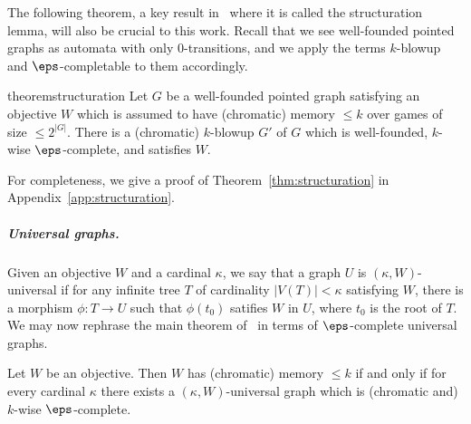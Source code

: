 
The following theorem, a key result in~\cite{CO25LMCS} where it is called the structuration lemma, will also be crucial to this work.
Recall that we see well-founded pointed graphs as automata with only $0$-transitions, and we apply the terms $k$-blowup and $\eps$-completable to them accordingly.

\begin{restatable}{theorem}{structuration}
    \label{thm:structuration}
    Let $G$ be a well-founded pointed graph satisfying an objective $W$ which is assumed to have (chromatic) memory $\leq k$ over games of size $\leq 2^{|G|}$.
    There is a (chromatic) $k$-blowup $G'$ of $G$ which is well-founded, $k$-wise $\eps$-complete, and satisfies $W$.
\end{restatable}

For completeness, we give a proof of Theorem~\ref{thm:structuration} in Appendix~\ref{app:structuration}.

\subparagraph*{Universal graphs.}
Given an objective $W$ and a cardinal $\kappa$, we say that a graph $U$ is $(\kappa,W)$-universal if for any infinite tree $T$ of cardinality $|V(T)|<\kappa$ satisfying $W$, there is a morphism $\phi:T \to U$ such that $\phi(t_0)$ satifies $W$ in $U$, where $t_0$ is the root of $T$.
We may now rephrase the main theorem of~\cite{CO25LMCS} in terms of $\eps$-complete universal graphs.

\begin{theorem}\label{thm:universal_graphs}
Let $W$ be an objective.
Then $W$ has (chromatic) memory $\leq k$ if and only if for every cardinal $\kappa$ there exists a $(\kappa,W)$-universal graph which is (chromatic and) $k$-wise $\eps$-complete.
\end{theorem}


